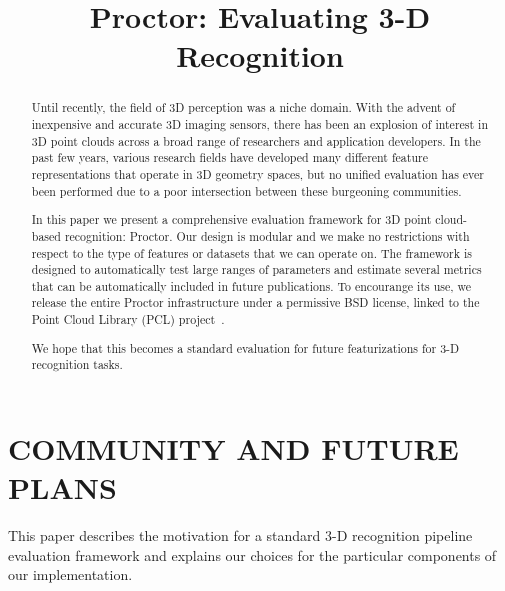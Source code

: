 \documentclass[a4paper, 10pt, conference]{ieeeconf}      %
\title{\LARGE \bf
Proctor: Evaluating 3-D Recognition
}
\begin{document}
\maketitle
\thispagestyle{empty}
\pagestyle{empty}

\begin{abstract}


Until recently, the field of 3D perception was a niche domain. With the advent
of inexpensive and accurate 3D imaging sensors, there has been an explosion of
interest in 3D point clouds across a broad range of researchers and application
developers. In the past few years, various research fields have developed
many different feature representations that operate in 3D geometry spaces, but
no unified evaluation has ever been performed due to a poor intersection between
these burgeoning communities.

In this paper we present a comprehensive evaluation framework for 3D point
cloud-based recognition: Proctor. Our design is modular and we make no
restrictions with respect to the type of features or datasets that we can
operate on. The framework is designed to automatically test large ranges of
parameters and estimate several metrics that can be automatically included in
future publications. To encourange its use, we release the entire Proctor
infrastructure under a permissive BSD license, linked to the Point Cloud
Library (PCL) project~\cite{PCL}.


We hope that this becomes a standard evaluation for future featurizations for
3-D recognition tasks.

\end{abstract}







\section{COMMUNITY AND FUTURE PLANS}

This paper describes the motivation for a standard 3-D recognition pipeline
evaluation framework and explains our choices for the particular components of
our implementation.
\end{document}
